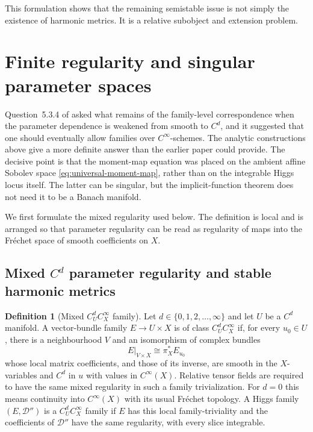 \documentclass[11pt,reqno]{amsart}
\theoremstyle{definition}
\newtheorem{definition}[theorem]{Definition}
\theoremstyle{remark}
\newcommand{\cD}{\mathcal D}
\begin{document}
This formulation shows that the remaining semistable issue is not simply the existence of harmonic metrics.  It is a relative subobject and extension problem.


\section{Finite regularity and singular parameter spaces}\label{sec:finite-regularity}

Question~5.3.4 of \cite{AzamRayan2026} asked what remains of the family-level correspondence when the parameter dependence is weakened from smooth to $C^d$, and it suggested that one should eventually allow families over $C^\infty$-schemes.  The analytic constructions above give a more definite answer than the earlier paper could provide.  The decisive point is that the moment-map equation was placed on the ambient affine Sobolev space \eqref{eq:universal-moment-map}, rather than on the integrable Higgs locus itself.  The latter can be singular, but the implicit-function theorem does not need it to be a Banach manifold.

We first formulate the mixed regularity used below.  The definition is local and is arranged so that parameter regularity can be read as regularity of maps into the Fr\'echet space of smooth coefficients on $X$.

\subsection{Mixed \texorpdfstring{$C^d$}{Cd} parameter regularity and stable harmonic metrics}

\begin{definition}[Mixed $C^d_UC^\infty_X$ family]\label{def:mixed-Cd-family}
Let $d\in\{0,1,2,\ldots,\infty\}$ and let $U$ be a $C^d$ manifold.  A vector-bundle family $E\to U\times X$ is of class $C^d_UC^\infty_X$ if, for every $u_0\in U$, there is a neighbourhood $V$ and an isomorphism of complex bundles
\[
  E|_{V\times X}\cong \pi_X^*E_{u_0}
\]
whose local matrix coefficients, and those of its inverse, are smooth in the $X$-variables and $C^d$ in $u$ with values in $C^\infty(X)$.  Relative tensor fields are required to have the same mixed regularity in such a family trivialization.  For $d=0$ this means continuity into $C^\infty(X)$ with its usual Fr\'echet topology.  A Higgs family $(E,\cD'')$ is a $C^d_UC^\infty_X$ family if $E$ has this local family-triviality and the coefficients of $\cD''$ have the same regularity, with every slice integrable.
\end{definition}
\end{document}
